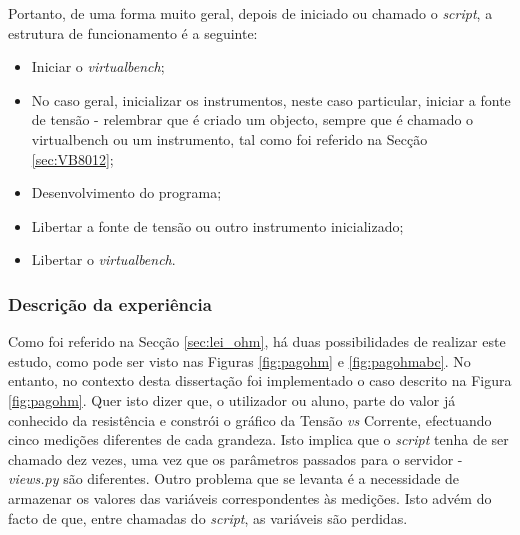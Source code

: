 Portanto, de uma forma muito geral, depois de iniciado ou chamado o \textit{script}, a estrutura de funcionamento é a seguinte:
\begin{itemize}
	\item Iniciar o \textit{virtualbench};
	\item No caso geral, inicializar os instrumentos, neste caso particular, iniciar a fonte de tensão - relembrar que é criado um objecto, sempre que é chamado o \acrshort{virtualbench} ou um instrumento, tal como foi referido na Secção \ref{sec:VB8012};
	\item Desenvolvimento do programa;
	\item Libertar a fonte de tensão ou outro instrumento inicializado;
	\item Libertar o \textit{virtualbench}.
\end{itemize}

\subsubsection{Descrição da experiência}
\label{sec:descricao_experiencia}
Como foi referido na Secção \ref{sec:lei_ohm}, há duas possibilidades de realizar este estudo, como pode ser visto nas Figuras \ref{fig:pagohm} e \ref{fig:pagohmabc}. No entanto, no contexto desta dissertação foi implementado o caso descrito na Figura \ref{fig:pagohm}. Quer isto dizer que, o utilizador ou aluno, parte do valor já conhecido da resistência e constrói o gráfico da Tensão \textit{vs} Corrente, efectuando cinco medições diferentes de cada grandeza. Isto implica que o \textit{script} tenha de ser chamado dez vezes, uma vez que os parâmetros passados para o servidor - \textit{views.py} são diferentes. Outro problema que se levanta é a necessidade de armazenar os valores das variáveis correspondentes às medições. Isto advém do facto de que, entre chamadas do \textit{script}, as variáveis são perdidas.

